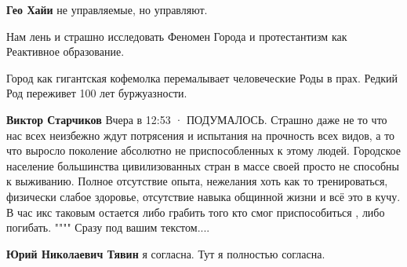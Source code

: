 \begin{itemize}
\begin{itemize}
\textbf{Гео Хайи} не управляемые, но управляют.
\end{itemize}

 
Нам лень и страшно исследовать Феномен Города и протестантизм как Реактивное
образование.

\begin{itemize}
 
Город как гигантская кофемолка перемалывает человеческие Роды в прах. Редкий Род переживет 100 лет буржуазности.
\end{itemize}

 
\textbf{Виктор Старчиков}
Вчера в 12:53 ·
ПОДУМАЛОСЬ.
Страшно даже не то что нас всех неизбежно ждут потрясения и испытания на прочность всех видов, а то что выросло поколение абсолютно не приспособленных к этому людей.
Городское население большинства цивилизованных стран в массе своей просто не способны к выживанию.
Полное отсутствие опыта, нежелания хоть как то тренироваться, физически слабое здоровье, отсутствие навыка общинной жизни и всё это в кучу.
В час икс таковым остается либо грабить того кто смог приспособиться , либо погибать. """" Сразу под вашим текстом....

\begin{itemize}
 
\textbf{Юрий Николаевич Тявин} я согласна. Тут я полностью согласна.

 

\end{itemize}
\end{itemize}
